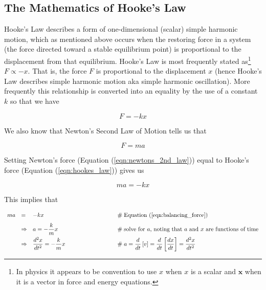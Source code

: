\documentclass{article}
\theoremstyle{definition}
\begin{document}
\subsection{The Mathematics of Hooke's Law}
\label{subsec:mathematics_of_hookes_law}
\bigskip
\noindent
Hooke's Law describes a form of one-dimensional (scalar) simple
harmonic motion, which as mentioned above occurs when the
restoring force in a system (the force directed toward a stable
equilibrium point) is proportional to the displacement from that
equilibrium. Hooke's Law is most frequently stated as\footnote{In
physics it appears to be convention to use $x$ when $x$ is a scalar 
and $\mathbf{x}$ when it is a vector in force and energy
equations.} $F \propto -x$. That is, the force $F$ is
proportional to the displacement $x$ (hence Hooke's Law describes
simple harmonic motion aka simple harmonic oscillation).  More
frequently this relationship is converted into an equality by the
use of a constant $k$ so that we have


\begin{equation}
F =-kx
\label{eqn:hookes_law}
\end{equation}


\bigskip
\noindent
We also know that Newton's 
Second Law of Motion \cite{wiki:newtons_laws} 
tells us that 

\begin{equation}
F = ma
\label{eqn:newtons_2nd_law}
\end{equation}

\medskip
\noindent
Setting Newton's force (Equation (\ref{eqn:newtons_2nd_law})) 
equal to Hooke's force (Equation (\ref{eqn:hookes_law})) 
gives us

\begin{equation}
ma = -kx
\label{eqn:balancing_force}
\end{equation}

\medskip
\noindent
This implies that

\begin{equation*}
\begin{array}{llll}
ma
&=& -kx
        &\hspace{8em} \mathrel{\#} \text{Equation (\ref{eqn:balancing_force})} \\
[7pt]
&\Rightarrow& a = - \dfrac{k}{m} x
        &\hspace{8em}\mathrel{\#} \text{solve for $a$, noting
                                        that $a$ and $x$ are
                                        functions of time} \\  
[7pt]
&\Rightarrow& \dfrac{d^2 x}{dt^2} = - \dfrac{k}{m} x	
        &\hspace{8em}\mathrel{\#} a
        = \dfrac{d}{dt} \left [ v \right ]
        = \dfrac{d}{dt} \left [ \dfrac{dx}{dt} \right ]
        = \dfrac{d^2 x}{dt^2} \\
\end{array}
\end{equation*}
\end{document}
